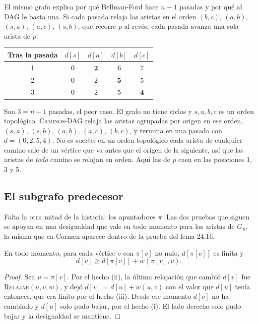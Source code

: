 \documentclass[11pt,letterpaper]{article}
\begin{document}
El mismo grafo explica por qué Bellman-Ford hace $n - 1$ pasadas y
por qué al DAG le basta una. Si cada pasada relaja las aristas en el
orden $(b, c)$, $(a, b)$, $(s, a)$, $(a, c)$, $(s, b)$, que recorre
$p$ al revés, cada pasada avanza una sola arista de $p$:
\begin{center}
\small
\begin{tabular}{ccccc}
  \toprule
  \textbf{Tras la pasada} & $d[s]$ & $d[a]$ & $d[b]$ & $d[c]$ \\
  \midrule
  1 & $0$ & $\mathbf{2}$ & $6$ & $7$ \\
  2 & $0$ & $2$ & $\mathbf{5}$ & $5$ \\
  3 & $0$ & $2$ & $5$ & $\mathbf{4}$ \\
  \bottomrule
\end{tabular}
\end{center}
Son $3 = n - 1$ pasadas, el peor caso. El grafo no tiene ciclos y
$s, a, b, c$ es un orden topológico. \textsc{Caminos-DAG} relaja las
aristas agrupadas por origen en ese orden, $(s, a)$, $(s, b)$,
$(a, b)$, $(a, c)$, $(b, c)$, y termina en una pasada con
$d = (0, 2, 5, 4)$. No es suerte: en un orden topológico cada arista
de cualquier camino sale de un vértice que va antes que el origen de
la siguiente, así que las aristas de \emph{todo} camino se relajan en
orden. Aquí las de $p$ caen en las posiciones 1, 3 y 5.


\subsection*{El subgrafo predecesor}

Falta la otra mitad de la historia: los apuntadores $\pi$. Las dos
pruebas que siguen se apoyan en una desigualdad que vale en todo
momento para las aristas de $G_\pi$, la misma que en Cormen aparece
dentro de la prueba del lema 24.16.

\begin{lema}\label{lem:prueba-arista-pred}
  En todo momento, para cada vértice $v$ con $\pi[v]$ no nulo,
  $d[\pi[v]]$ es finita y
  \[
    d[v] \ge d[\pi[v]] + w(\pi[v], v) .
  \]
\end{lema}

\begin{proof}
  Sea $u = \pi[v]$. Por el hecho (ii), la última relajación que cambió
  $d[v]$ fue \textsc{Relajar}$(u, v, w)$, y dejó
  $d[v] = d[u] + w(u, v)$ con el valor que $d[u]$ tenía entonces, que
  era finito por el hecho (iii). Desde ese momento $d[v]$ no ha
  cambiado y $d[u]$ solo pudo bajar, por el hecho (i). El lado derecho
  solo pudo bajar y la desigualdad se mantiene.
\end{proof}
\end{document}
